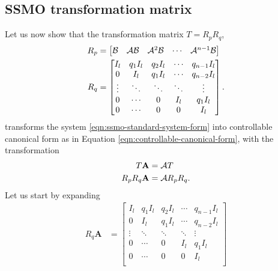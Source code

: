 \begin{appendices}
\section{SSMO transformation matrix}\label{ap:ssmo-transformation-matrix}
Let us now show that the transformation matrix $T=R_pR_q$,
\begin{equation*}
    \begin{split}
         R_p &=
        \begin{bmatrix}
            \mathcal{B} & \mathcal{A}\mathcal{B} & \mathcal{A}^{2}\mathcal{B} & \cdots & \mathcal{A}^{n-1}\mathcal{B} \\
        \end{bmatrix} \\
        R_q &=
        \begin{bmatrix}
            I_l & q_1I_l & q_2I_l & \cdots & q_{n-1}I_l \\
            0 & I_l & q_1I_l & \cdots & q_{n-2}I_l \\
            \vdots & \ddots & \ddots & \ddots & \vdots \\
            0 & \cdots & 0 & I_l & q_1I_l \\
            0 & \cdots & 0 & 0 & I_l \\
        \end{bmatrix}.
    \end{split}
\end{equation*}
transforms the system \eqref{eqn:ssmo-standard-system-form} into controllable canonical form as in Equation \eqref{eqn:controllable-canonical-form}, with the transformation
\begin{equation}\label{eqn:A-transformation}
    \begin{split}
        T\mathbf{A} &= \mathcal{A} T \\
        R_pR_q\mathbf{A} &= \mathcal{A} R_pR_q. \\
    \end{split}
\end{equation}
 Let us start by expanding
\begin{equation*}
    \begin{split}
        R_q\mathbf{A} &=  
        \begin{bmatrix}
            I_l & q_1I_l & q_2I_l & \cdots & q_{n-1}I_l \\
            0 & I_l & q_1I_l & \cdots & q_{n-2}I_l \\
            \vdots & \ddots & \ddots & \ddots & \vdots \\
            0 & \cdots & 0 & I_l & q_1I_l \\
            0 & \cdots & 0 & 0 & I_l \\

\end{bmatrix}
\end{split}
\end{equation*}
\end{appendices}
